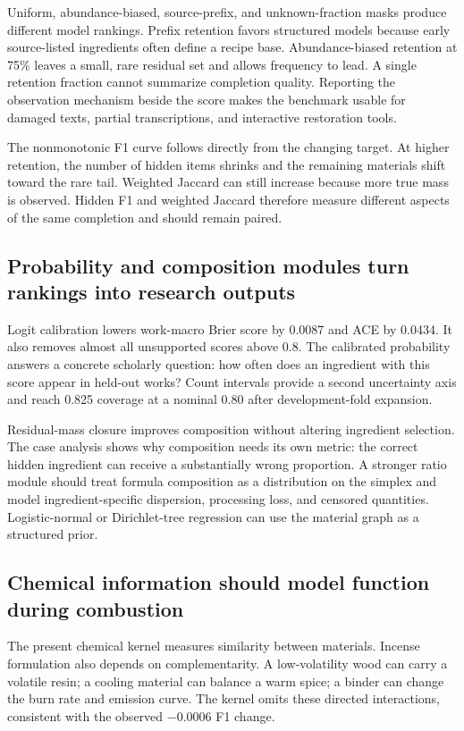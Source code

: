 \documentclass[11pt,a4paper]{article}
\begin{document}
Uniform, abundance-biased, source-prefix, and unknown-fraction masks produce different model rankings. Prefix retention favors structured models because early source-listed ingredients often define a recipe base. Abundance-biased retention at 75\% leaves a small, rare residual set and allows frequency to lead. A single retention fraction cannot summarize completion quality. Reporting the observation mechanism beside the score makes the benchmark usable for damaged texts, partial transcriptions, and interactive restoration tools.

The nonmonotonic F1 curve follows directly from the changing target. At higher retention, the number of hidden items shrinks and the remaining materials shift toward the rare tail. Weighted Jaccard can still increase because more true mass is observed. Hidden F1 and weighted Jaccard therefore measure different aspects of the same completion and should remain paired.

\subsection{Probability and composition modules turn rankings into research outputs}

Logit calibration lowers work-macro Brier score by 0.0087 and ACE by 0.0434. It also removes almost all unsupported scores above 0.8. The calibrated probability answers a concrete scholarly question: how often does an ingredient with this score appear in held-out works? Count intervals provide a second uncertainty axis and reach 0.825 coverage at a nominal 0.80 after development-fold expansion.

Residual-mass closure improves composition without altering ingredient selection. The case analysis shows why composition needs its own metric: the correct hidden ingredient can receive a substantially wrong proportion. A stronger ratio module should treat formula composition as a distribution on the simplex and model ingredient-specific dispersion, processing loss, and censored quantities. Logistic-normal or Dirichlet-tree regression can use the material graph as a structured prior.

\subsection{Chemical information should model function during combustion}

The present chemical kernel measures similarity between materials. Incense formulation also depends on complementarity. A low-volatility wood can carry a volatile resin; a cooling material can balance a warm spice; a binder can change the burn rate and emission curve. The kernel omits these directed interactions, consistent with the observed $-0.0006$ F1 change.
\end{document}
